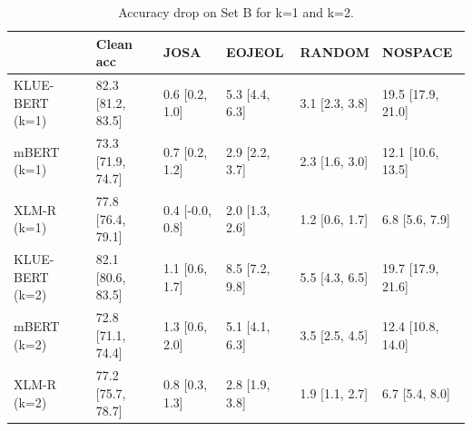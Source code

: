 \begin{table}
\caption{Accuracy drop on Set B for k=1 and k=2.}
\label{tab:table4_setB}
\begin{tabular}{llllll}
\toprule
 & Clean acc & JOSA & EOJEOL & RANDOM & NOSPACE \\
\midrule
KLUE-BERT (k=1) & 82.3 [81.2, 83.5] & 0.6 [0.2, 1.0] & 5.3 [4.4, 6.3] & 3.1 [2.3, 3.8] & 19.5 [17.9, 21.0] \\
mBERT (k=1) & 73.3 [71.9, 74.7] & 0.7 [0.2, 1.2] & 2.9 [2.2, 3.7] & 2.3 [1.6, 3.0] & 12.1 [10.6, 13.5] \\
XLM-R (k=1) & 77.8 [76.4, 79.1] & 0.4 [-0.0, 0.8] & 2.0 [1.3, 2.6] & 1.2 [0.6, 1.7] & 6.8 [5.6, 7.9] \\
KLUE-BERT (k=2) & 82.1 [80.6, 83.5] & 1.1 [0.6, 1.7] & 8.5 [7.2, 9.8] & 5.5 [4.3, 6.5] & 19.7 [17.9, 21.6] \\
mBERT (k=2) & 72.8 [71.1, 74.4] & 1.3 [0.6, 2.0] & 5.1 [4.1, 6.3] & 3.5 [2.5, 4.5] & 12.4 [10.8, 14.0] \\
XLM-R (k=2) & 77.2 [75.7, 78.7] & 0.8 [0.3, 1.3] & 2.8 [1.9, 3.8] & 1.9 [1.1, 2.7] & 6.7 [5.4, 8.0] \\
\bottomrule
\end{tabular}
\end{table}
